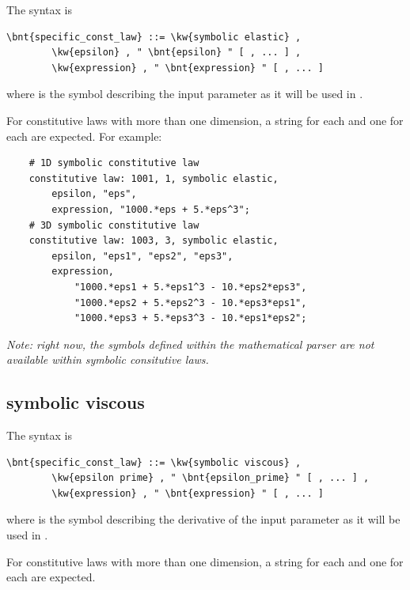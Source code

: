 The syntax is
\begin{Verbatim}[commandchars=\\\{\}]
    \bnt{specific_const_law} ::= \kw{symbolic elastic} ,
        \kw{epsilon} , " \bnt{epsilon} " [ , ... ] ,
        \kw{expression} , " \bnt{expression} " [ , ... ]
\end{Verbatim}
where  is the symbol describing the input
parameter as it will be used in .

For constitutive laws with more than one dimension,
a string for each  and one for each 
are expected.  For example:
\begin{verbatim}
    # 1D symbolic constitutive law
    constitutive law: 1001, 1, symbolic elastic,
        epsilon, "eps",
        expression, "1000.*eps + 5.*eps^3";
    # 3D symbolic constitutive law
    constitutive law: 1003, 3, symbolic elastic,
        epsilon, "eps1", "eps2", "eps3",
        expression,
            "1000.*eps1 + 5.*eps1^3 - 10.*eps2*eps3",
            "1000.*eps2 + 5.*eps2^3 - 10.*eps3*eps1",
            "1000.*eps3 + 5.*eps3^3 - 10.*eps1*eps2";
\end{verbatim}

\emph{Note: right now, the symbols defined within the mathematical parser
are not available within symbolic consitutive laws.}

\subsection{symbolic viscous}\label{sec:CL:SYMBOLIC-VISCOUS}
The syntax is
\begin{Verbatim}[commandchars=\\\{\}]
    \bnt{specific_const_law} ::= \kw{symbolic viscous} ,
        \kw{epsilon prime} , " \bnt{epsilon_prime} " [ , ... ] ,
        \kw{expression} , " \bnt{expression} " [ , ... ]
\end{Verbatim}
where  is the symbol describing the derivative
of the input parameter as it will be used in .

For constitutive laws with more than one dimension,
a string for each  and one for each 
are expected.


